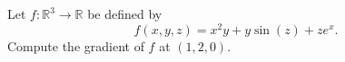 \documentclass[openany]{book}
\begin{document}







\begin{prob}
    Let \( f : \mathbb{R}^3 \to \mathbb{R} \) be defined by  
\[
f(x, y, z) = x^2 y + y \sin(z) + z e^x.
\]  
Compute the gradient of $f$ at $(1,2,0)$.
\end{prob}

\end{document}
